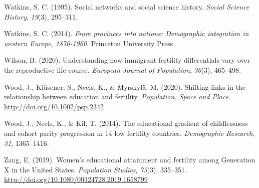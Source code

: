 \documentclass[12pt,twoside]{reedthesis}
\begin{document}
\leavevmode\hypertarget{ref-watkins1995}{}%
Watkins, S. C. (1995). Social networks and social science history. \emph{Social Science History}, \emph{19}(3), 295--311.

\leavevmode\hypertarget{ref-watkins2014}{}%
Watkins, S. C. (2014). \emph{From provinces into nations: Demographic integration in western Europe, 1870-1960}. Princeton University Press.

\leavevmode\hypertarget{ref-wilson2020}{}%
Wilson, B. (2020). Understanding how immigrant fertility differentials vary over the reproductive life course. \emph{European Journal of Population}, \emph{36}(3), 465--498.

\leavevmode\hypertarget{ref-wood2020}{}%
Wood, J., Klüsener, S., Neels, K., \& Myrskylä, M. (2020). Shifting links in the relationship between education and fertility. \emph{Population, Space and Place}. \url{http://doi.org/10.1002/psp.2342}

\leavevmode\hypertarget{ref-wood2014}{}%
Wood, J., Neels, K., \& Kil, T. (2014). The educational gradient of childlessness and cohort parity progression in 14 low fertility countries. \emph{Demographic Research}, \emph{31}, 1365--1416.

\leavevmode\hypertarget{ref-zang2019}{}%
Zang, E. (2019). Women's educational attainment and fertility among Generation X in the United States. \emph{Population Studies}, \emph{73}(3), 335--351. \url{http://doi.org/10.1080/00324728.2019.1658799}


\end{document}
